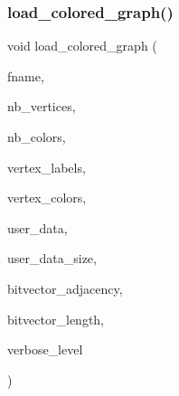 \subsubsection{\texorpdfstring{load\+\_\+colored\+\_\+graph()}{load\_colored\_graph()}}
{\footnotesize\ttfamily void load\+\_\+colored\+\_\+graph (\begin{DoxyParamCaption}\item[{const \mbox{\hyperlink{galois_8h_ab6cc7b4aeb6ea31aba2b3fbfc83ff5e6}{B\+Y\+TE}} $\ast$}]{fname,  }\item[{\mbox{\hyperlink{galois_8h_a09fddde158a3a20bd2dcadb609de11dc}{I\+NT}} \&}]{nb\+\_\+vertices,  }\item[{\mbox{\hyperlink{galois_8h_a09fddde158a3a20bd2dcadb609de11dc}{I\+NT}} \&}]{nb\+\_\+colors,  }\item[{\mbox{\hyperlink{galois_8h_a09fddde158a3a20bd2dcadb609de11dc}{I\+NT}} $\ast$\&}]{vertex\+\_\+labels,  }\item[{\mbox{\hyperlink{galois_8h_a09fddde158a3a20bd2dcadb609de11dc}{I\+NT}} $\ast$\&}]{vertex\+\_\+colors,  }\item[{\mbox{\hyperlink{galois_8h_a09fddde158a3a20bd2dcadb609de11dc}{I\+NT}} $\ast$\&}]{user\+\_\+data,  }\item[{\mbox{\hyperlink{galois_8h_a09fddde158a3a20bd2dcadb609de11dc}{I\+NT}} \&}]{user\+\_\+data\+\_\+size,  }\item[{\mbox{\hyperlink{galois_8h_a122c4acf389c050379f00341fdcd5812}{U\+B\+Y\+TE}} $\ast$\&}]{bitvector\+\_\+adjacency,  }\item[{\mbox{\hyperlink{galois_8h_a09fddde158a3a20bd2dcadb609de11dc}{I\+NT}} \&}]{bitvector\+\_\+length,  }\item[{\mbox{\hyperlink{galois_8h_a09fddde158a3a20bd2dcadb609de11dc}{I\+NT}}}]{verbose\+\_\+level }\end{DoxyParamCaption})}

\mbox{\label{galois__global_8_c_acf26a87efbf2d1f65cfe00e177cc9fc8}} 
